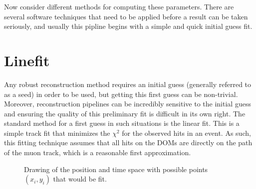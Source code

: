 Now consider different methods for computing these parameters. There are several software techniques that need to be applied before a result can be taken seriously, and usually this pipline begins with a simple and quick initial guess fit. 

\section{Linefit}

Any robust reconstruction method requires an initial guess (generally referred to as a seed) in order to be used, but getting this first guess can be non-trivial. Moreover, reconstruction pipelines can be incredibly sensitive to the initial guess and ensuring the quality of this preliminary fit is difficult in its own right. The standard method for a first guess in such situations is the linear fit. This is a simple track fit that minimizes the $\chi^{2}$ for the observed hits in an event. As such, this fitting technique assumes that all hits on the DOMs are directly on the path of the muon track, which is a reasonable first approximation.

\begin{figure}
  \centering
  \caption{Drawing of the position and time space with possible points $(x_{i},y_{i})$ that would be fit.}
  \label{fig:linfit}
\end{figure}

